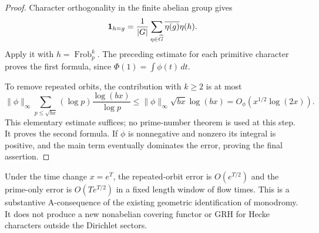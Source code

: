 \begin{proof}
Character orthogonality in the finite abelian group gives
\[
 {\bf1}_{h=g}=\frac1{|G|}\sum_{\eta\in\widehat G}
                 \overline{\eta(g)}\eta(h).
\]
Apply it with $h=\operatorname{Frob}_p^k$.  The preceding estimate for
each primitive character proves the first formula, since
$\Phi(1)=\int\phi(t)\,dt$.

To remove repeated orbits, the contribution with $k\geq2$ is at most
\[
 \|\phi\|_\infty
 \sum_{p\leq\sqrt{bx}}(\log p)
       \frac{\log(bx)}{\log p}
 \leq \|\phi\|_\infty\sqrt{bx}\log(bx)
 =O_\phi(x^{1/2}\log(2x)).
\]
This elementary estimate suffices; no prime-number theorem is used at
this step.  It proves the second formula.  If $\phi$ is nonnegative
and nonzero its integral is positive, and the main term eventually
dominates the error, proving the final assertion.
\end{proof}

\begin{remark}
Under the time change $x=e^T$, the repeated-orbit error is
$O(e^{T/2})$ and the prime-only error is $O(Te^{T/2})$ in a fixed
length window of flow times.  This is a substantive A-consequence of
the existing geometric identification of monodromy.  It does not
produce a new nonabelian covering functor or GRH for Hecke characters
outside the Dirichlet sectors.
\end{remark}

